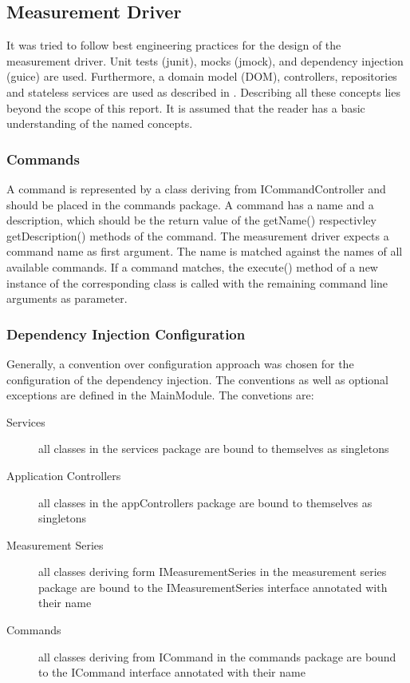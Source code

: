 \documentclass[a4paper,12pt]{article}
\begin{document}
\subsection{Measurement Driver}
It was tried to follow best engineering practices for the design of the measurement driver. Unit tests (junit), mocks (jmock), and dependency injection  (guice) are used. Furthermore, a domain model (DOM), controllers, repositories and stateless services are used as described in \cite{evans2004domain}. Describing all these concepts lies beyond the scope of this report. It is assumed that the reader has a basic understanding of the named concepts.

\subsubsection{Commands}
A command is represented by a class deriving from ICommandController and should be placed in the commands package. A command has a name and a description, which should be the return value of the getName() respectivley getDescription() methods of the command. The measurement driver expects a command name as first argument. The name is matched against the names of all available commands. If a command matches, the execute() method of a new instance of the corresponding class is called with the remaining command line arguments as parameter.

\subsubsection{Dependency Injection Configuration}
Generally, a convention over configuration approach was chosen for the configuration of the dependency injection. The conventions as well as optional exceptions are defined in the MainModule. 
The convetions are:
\begin{description}
\item[Services] all classes in the services package are bound to themselves as singletons
\item[Application Controllers] all classes in the appControllers package are bound to themselves as singletons
\item[Measurement Series] all classes deriving form IMeasurementSeries in the measurement series package are bound to the IMeasurementSeries interface annotated with their name
\item[Commands] all classes deriving from ICommand in the commands package are bound to the ICommand interface annotated with their name
\end{description}
\end{document}
